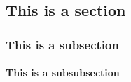 
\chapter{} 
\lipsum[20]
\section{This is a section}
\lipsum[50]
\subsection{This is a subsection}
\lipsum[50]
\subsubsection{This is a subsubsection}
\lipsum[50]